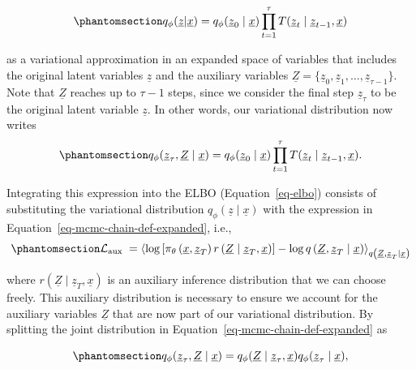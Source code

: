 \documentclass[
]{scrartcl}
\begin{document}
\begin{refsection}
\begin{equation}\phantomsection\label{eq-mcmc-chain-def}{
q_\phi(\underline{z} | \underline{x}) = 
q_\phi(\underline{z}_0 \mid \underline{x}) 
\prod_{t=1}^\tau T(\underline{z}_t \mid \underline{z}_{t-1}, \underline{x})
}\end{equation}

as a variational approximation in an expanded space of variables that
includes the original latent variables \(\underline{z}\) and the
auxiliary variables
\(\underline{Z} = \{\underline{z}_0, \underline{z}_1, \ldots,
\underline{z}_{\tau-1}\}\). Note that \(\underline{Z}\) reaches up to
\(\tau-1\) steps, since we consider the final step
\(\underline{z}_\tau\) to be the original latent variable
\(\underline{z}\). In other words, our variational distribution now
writes
\begin{equation}\phantomsection\label{eq-mcmc-chain-def-expanded}{
q_\phi(\underline{z}_\tau, \underline{Z} \mid \underline{x}) = 
q_\phi(\underline{z}_0 \mid \underline{x}) 
\prod_{t=1}^\tau T(\underline{z}_t \mid \underline{z}_{t-1}, \underline{x}).
}\end{equation}

Integrating this expression into the ELBO (Equation~\ref{eq-elbo})
consists of substituting the variational distribution
\(q_\phi(\underline{z} \mid \underline{x})\) with the expression in
Equation~\ref{eq-mcmc-chain-def-expanded}, i.e.,
\begin{equation}\phantomsection\label{eq-elbo-aux}{
\mathcal{L}_{\text {aux }} =
\left\langle\log 
    \left[
        \pi_\theta\left(\underline{x}, \underline{z}_T\right) 
        r\left(\underline{Z} \mid \underline{z}_T, \underline{x}\right)
    \right] - 
    \log q\left(\underline{Z}, \underline{z}_T \mid \underline{x}\right)
\right\rangle_{q\left(\underline{Z}, \underline{z}_T \mid \underline{x}\right)}
}\end{equation}

where \(r(\underline{Z} \mid \underline{z}_T, \underline{x})\) is an
auxiliary inference distribution that we can choose freely. This
auxiliary distribution is necessary to ensure we account for the
auxiliary variables \(\underline{Z}\) that are now part of our
variational distribution. By splitting the joint distribution in
Equation~\ref{eq-mcmc-chain-def-expanded} as

\begin{equation}\phantomsection\label{eq-mcmc-chain-def-expanded-2}{
q_\phi(\underline{z}_\tau, \underline{Z} \mid \underline{x}) =
q_\phi(\underline{Z} \mid \underline{z}_\tau, \underline{x}) q_\phi(\underline{z}_\tau \mid \underline{x}),
}\end{equation}


\end{refsection}
\end{document}
